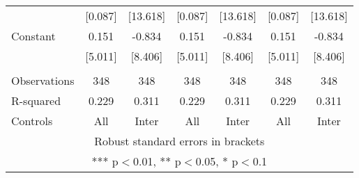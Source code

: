 \begin{tabular}{lcccccc}
 & [0.087] & [13.618] & [0.087] & [13.618] & [0.087] & [13.618] \\
Constant & 0.151 & -0.834 & 0.151 & -0.834 & 0.151 & -0.834 \\
 & [5.011] & [8.406] & [5.011] & [8.406] & [5.011] & [8.406] \\
 &  &  &  &  &  &  \\
Observations & 348 & 348 & 348 & 348 & 348 & 348 \\
R-squared & 0.229 & 0.311 & 0.229 & 0.311 & 0.229 & 0.311 \\
 Controls & All & Inter & All & Inter & All & Inter \\ \hline
\multicolumn{7}{c}{ Robust standard errors in brackets} \\
\multicolumn{7}{c}{ *** p$<$0.01, ** p$<$0.05, * p$<$0.1} \\
\end{tabular}
